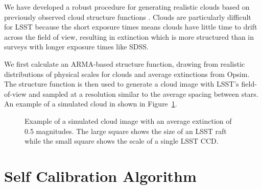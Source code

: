 \documentclass[12pt,preprint]{aastex}
\begin{document}
We have developed a robust procedure for generating realistic clouds based on previously observed cloud structure functions \citep{Ivezic2007,Burke2010}. Clouds are particularly difficult for LSST because the short exposure times means clouds have little time to drift across the field of view, resulting in extinction which is more structured than in surveys with longer exposure times like SDSS.  

We first calculate an ARMA-based structure function, drawing from realistic distributions of physical scales for clouds and average extinctions from Opsim.  The structure function is then used to generate a cloud image with LSST's field-of-view and sampled at a resolution similar to the average spacing between stars.  An example of a simulated cloud in shown in Figure~\ref{fig:cloud}.  


\begin{figure}
\caption{Example of a simulated cloud image with an average extinction of 0.5 magnitudes.  The large square shows the size of an LSST raft while the small square shows the scale of a single LSST CCD.  \label{fig:cloud}}
\end{figure}




\section{Self Calibration Algorithm}\label{alg}
\end{document}
